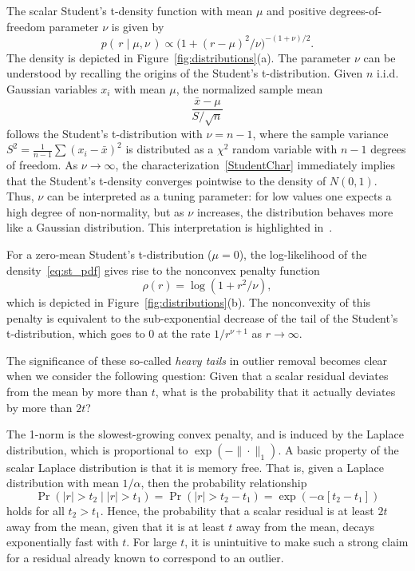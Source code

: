 \documentclass[nospthms]{svjour3}
\numberwithin{equation}{section}
\begin{document}
The scalar Student's t-density function with mean $\mu$ and
positive degrees-of-freedom parameter $\nu$ is given by
\begin{equation}
  \label{eq:st_pdf}
  p(\,r \mid \mu, \nu\,)
  \propto \big(1 + (r - \mu)^2/\nu \big)^{-(1 + \nu)/2}.
\end{equation}
The density is depicted in Figure~\ref{fig:distributions}(a).
The parameter $\nu$ can be understood by recalling the origins of the
Student's t-distribution.  Given $n$ i.i.d. Gaussian variables $x_i$
with mean $\mu$, the normalized sample mean
\begin{equation}
  \label{StudentChar}
  \frac{ \bar x - \mu}{S/\sqrt{n}}
\end{equation}
follows the Student's t-distribution with $\nu = n-1$, where the
sample variance $S^2=\frac{1}{n-1}\sum (x_i - \bar x)^2$ is
distributed as a $\chi^2$ random variable with $n-1$ degrees of
freedom.  As $\nu \rightarrow \infty$, the
characterization~\eqref{StudentChar} immediately implies that the
Student's t-density converges pointwise to the density of
$N(0,1)$. Thus, $\nu$ can be interpreted as a tuning parameter: for
low values one expects a high degree of non-normality, but as $\nu$
increases, the distribution behaves more like a Gaussian
distribution. This interpretation is highlighted
in~\cite{Lange1989}. 

For a zero-mean Student's t-distribution ($\mu=0$), the log-likelihood
of the density~\eqref{eq:st_pdf} gives rise to the nonconvex penalty
function
\begin{equation} \label{eq:19}
  \rho(r) = \log(1 + r^2 / \nu),
\end{equation}
which is depicted in Figure~\ref{fig:distributions}(b).
The nonconvexity of this penalty is equivalent to the sub-exponential
decrease of the tail of the Student's t-distribution, which goes to $0$
at the rate $1/r^{\nu + 1}$ as $r\rightarrow \infty$.

The significance of these so-called \emph{heavy tails} in outlier
removal becomes clear when we consider the following question:
Given that a scalar residual deviates from the mean by more than $t$,
what is the probability that it actually deviates by more than $2t$?

The 1-norm is the slowest-growing convex penalty, and is induced by
the Laplace distribution, which is proportional to
$\exp(-\|\cdot\|_1)$.  A basic property of the scalar Laplace
distribution is that it is memory free. That is, given a Laplace
distribution with mean $1/\alpha$, then the probability relationship
\begin{equation}
\label{memoryFree}
\Pr(|r| > t_2 \mid |r| > t_1) = \Pr(|r| > t_2 - t_1) = \exp(-\alpha[t_2 - t_1])
\end{equation}
holds for all $t_2>t_1$. Hence, the probability that a scalar
residual is at least $2t$ away from the mean, given that it is at
least $t$ away from the mean, decays exponentially fast with $t$.
For large $t$, it is unintuitive to make such a strong claim for a
residual already known to correspond to an outlier.
\end{document}
